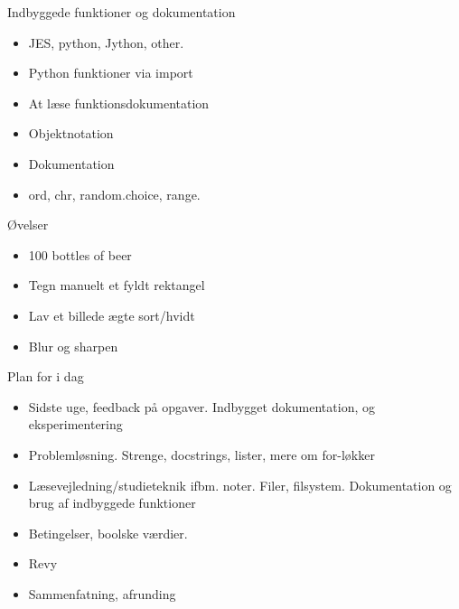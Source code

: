 \documentclass[a4paper,landscape]{slides}
\begin{document}
\begin{slide}
	\begin{center} {\large 
            Indbyggede funktioner og dokumentation
	} \end{center}
	\begin{itemize} \addtolength{\itemsep}{-\baselineskip}
		\item JES, python, Jython, other.
		\item Python funktioner via import
                \item At læse funktionsdokumentation
		\item Objektnotation
                \item Dokumentation
                \item ord, chr, random.choice, range.
	\end{itemize}
\end{slide}

\begin{slide}
	\begin{center} {\large 
            Øvelser
	} \end{center}
	\begin{itemize} \addtolength{\itemsep}{-\baselineskip}
    		\item 100 bottles of beer
    		\item Tegn manuelt et fyldt rektangel
    		\item Lav et billede ægte sort/hvidt
    		\item Blur og sharpen
	\end{itemize}
\end{slide}

\begin{slide}
	\begin{center} {\large 
            Plan for i dag
	} \end{center}
	\begin{itemize} \addtolength{\itemsep}{-\baselineskip}
    		\item Sidste uge, feedback på opgaver. Indbygget dokumentation, og eksperimentering
    		\item Problemløsning. Strenge, docstrings, lister, mere om for-løkker
    		\item Læsevejledning/studieteknik ifbm. noter. Filer, filsystem. Dokumentation og brug af indbyggede funktioner
    		\item Betingelser, boolske værdier.
    		\item Revy
    		\item Sammenfatning, afrunding
	\end{itemize}
\end{slide}
\end{document}
